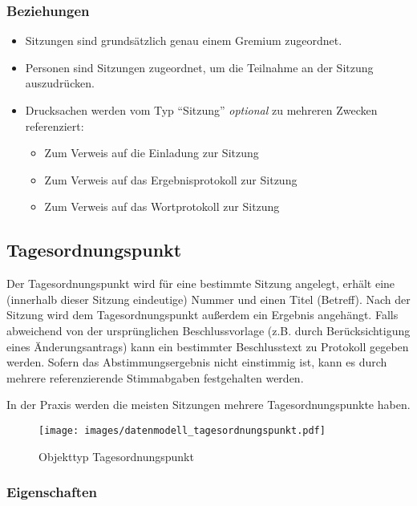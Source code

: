 \documentclass[,a4paper]{article}
\makeatletter
\def\maxwidth{\ifdim\Gin@nat@width>\linewidth\linewidth
\else\Gin@nat@width\fi}
\let\Oldincludegraphics\includegraphics
\renewcommand{\includegraphics}[1]{\Oldincludegraphics[width=\maxwidth]{#1}}
\makeatother
\begin{document}
\subsubsection{Beziehungen}

\begin{itemize}
\item
  Sitzungen sind grundsätzlich genau einem Gremium zugeordnet.
\item
  Personen sind Sitzungen zugeordnet, um die Teilnahme an der Sitzung
  auszudrücken.
\item
  Drucksachen werden vom Typ ``Sitzung'' \emph{optional} zu mehreren
  Zwecken referenziert:

  \begin{itemize}
  \item
    Zum Verweis auf die Einladung zur Sitzung
  \item
    Zum Verweis auf das Ergebnisprotokoll zur Sitzung
  \item
    Zum Verweis auf das Wortprotokoll zur Sitzung
  \end{itemize}
\end{itemize}

\subsection{Tagesordnungspunkt}

Der Tagesordnungspunkt wird für eine bestimmte Sitzung angelegt, erhält
eine (innerhalb dieser Sitzung eindeutige) Nummer und einen Titel
(Betreff). Nach der Sitzung wird dem Tagesordnungspunkt außerdem ein
Ergebnis angehängt. Falls abweichend von der ursprünglichen
Beschlussvorlage (z.B. durch Berücksichtigung eines Änderungsantrags)
kann ein bestimmter Beschlusstext zu Protokoll gegeben werden. Sofern
das Abstimmungsergebnis nicht einstimmig ist, kann es durch mehrere
referenzierende Stimmabgaben festgehalten werden.

In der Praxis werden die meisten Sitzungen mehrere Tagesordnungspunkte
haben.

\begin{figure}[htbp]
\centering
\texttt{[image: images/datenmodell\_tagesordnungspunkt.pdf]}
\caption{Objekttyp Tagesordnungspunkt}
\end{figure}

\subsubsection{Eigenschaften}
\end{document}
